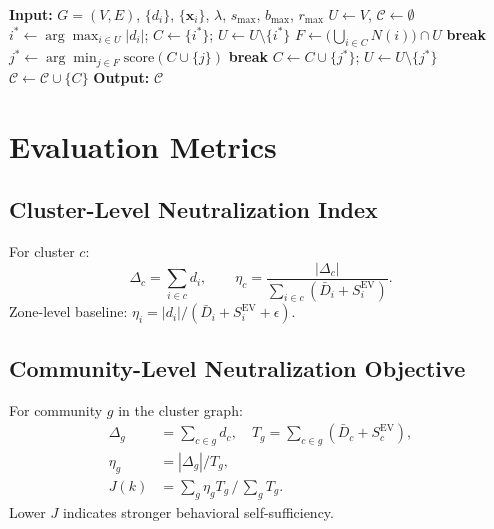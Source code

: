 \documentclass[conference]{IEEEtran}
\begin{document}
\begin{algorithm}[t]
\caption{NBZC: Greedy Neutralization + Shape-Constrained Clustering}
\label{alg:nbzc}
\begin{algorithmic}[1]
\STATE \textbf{Input:} $G=(V,E)$, $\{d_i\}$, $\{\mathbf{x}_i\}$,
       $\lambda$, $s_{\max}$, $b_{\max}$, $r_{\max}$
\STATE $U \leftarrow V$, $\mathcal{C}\leftarrow \emptyset$
  \STATE $i^*\leftarrow\arg\max_{i\in U}|d_i|$;
         $C\leftarrow\{i^*\}$; $U\leftarrow U\setminus\{i^*\}$
    \STATE $F\leftarrow\bigl(\bigcup_{i\in C}N(i)\bigr)\cap U$
     \STATE \textbf{break} \ENDIF
    \STATE $j^*\leftarrow\arg\min_{j\in F}\mathrm{score}(C\cup\{j\})$
     \STATE \textbf{break} \ENDIF
    \STATE $C\leftarrow C\cup\{j^*\}$; $U\leftarrow U\setminus\{j^*\}$
  \ENDWHILE
  \STATE $\mathcal{C}\leftarrow\mathcal{C}\cup\{C\}$
\ENDWHILE
\STATE \textbf{Output:} $\mathcal{C}$
\end{algorithmic}
\end{algorithm}

\section{Evaluation Metrics}
\label{sec:eval_metrics}

\subsection{Cluster-Level Neutralization Index}
For cluster $c$:
\begin{equation}
\Delta_c = \sum_{i\in c} d_i, \qquad
\eta_c =
\frac{|\Delta_c|}{\sum_{i\in c}(\bar{D}_i + S_i^{\mathrm{EV}})}.
\label{eq:eta_c}
\end{equation}
Zone-level baseline: $\eta_i = |d_i|/(\bar{D}_i+S_i^{\mathrm{EV}}+\epsilon)$.

\subsection{Community-Level Neutralization Objective}
For community $g$ in the cluster graph:
\begin{align}
\Delta_g &= \textstyle\sum_{c\in g} d_c, \quad
T_g = \textstyle\sum_{c\in g}(\bar{D}_c+S_c^{\mathrm{EV}}), \\
\eta_g   &= |\Delta_g|/T_g, \\
J(k)     &= \textstyle\sum_g \eta_g T_g \,/\, \textstyle\sum_g T_g.
\label{eq:J}
\end{align}
Lower $J$ indicates stronger behavioral self-sufficiency.
\end{document}
